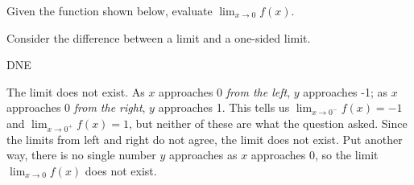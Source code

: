 \begin{question}
Given the function shown below, evaluate $\displaystyle \lim_{x \rightarrow 0} f(x)$.
\begin{center}
\end{center}
\end{question}
\begin{hint}
Consider the difference between a limit and a one-sided limit.
\end{hint}
\begin{answer}
DNE
\end{answer}
\begin{solution}
The limit does not exist. As $x$ approaches 0 \emph{from the left}, $y$ approaches -1; as $x$ approaches 0 \emph{from the right}, $y$ approaches 1. This tells us $\displaystyle\lim_{x \rightarrow 0^-} f(x)=-1$ and
$\displaystyle\lim_{x \rightarrow 0^+} f(x)=1$, but neither of these are what the question asked. Since the limits from left and right do not agree, the limit does not exist. Put another way, there is no single number $y$ approaches as $x$ approaches 0, so the limit $\displaystyle\lim_{x \rightarrow 0} f(x)$ does not exist.
\end{solution}


